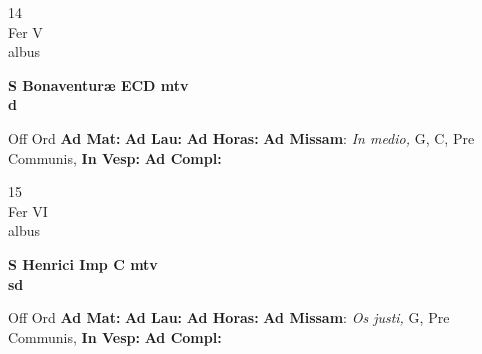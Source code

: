 \documentclass[10pt, openany]{book}
\begin{document}
        \begin{center}
            \begin{minipage}{3.5in}
                \vspace{2em}
                \begin{minipage}{0.5in}
                    {\Huge 14} \\
                    {\normalsize Fer V} \\
                    {\normalsize albus}
                \end{minipage}
                \begin{minipage}{3.0in}
                    \textbf{ \large S Bonaventuræ ECD mtv \\
                    \textnormal{\normalsize d}} \\ 
                \end{minipage}
                \begin{justify}Off Ord
                    \textbf{Ad Mat: }
                    \textbf{Ad Lau: }
                    \textbf{Ad Horas: }\textbf{Ad Missam}: \textit{In medio,} G, C, Pre Communis,  
                    \textbf{In Vesp: }
                    \textbf{Ad Compl: }
                \end{justify}
            \end{minipage}
        \end{center}
    
        \begin{center}
            \begin{minipage}{3.5in}
                \vspace{2em}
                \begin{minipage}{0.5in}
                    {\Huge 15} \\
                    {\normalsize Fer VI} \\
                    {\normalsize albus}
                \end{minipage}
                \begin{minipage}{3.0in}
                    \textbf{ \large S Henrici Imp C mtv \\
                    \textnormal{\normalsize sd}} \\ 
                \end{minipage}
                \begin{justify}Off Ord
                    \textbf{Ad Mat: }
                    \textbf{Ad Lau: }
                    \textbf{Ad Horas: }\textbf{Ad Missam}: \textit{Os justi,} G, Pre Communis,  
                    \textbf{In Vesp: }
                    \textbf{Ad Compl: }
                \end{justify}
            \end{minipage}
        \end{center}
    
\end{document}
